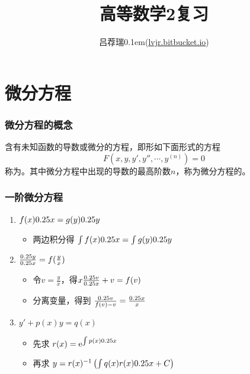 \documentclass[14pt,notheorems,leqno,xcolor={rgb}]{beamer} %
\begin{document}



\title{高等数学2复习}

\author{吕荐瑞\kern0.1em(\href{https://lvjr.bitbucket.io}{lvjr.bitbucket.io})}

\begin{frame}[plain]
\transboxout %
\titlepage
\end{frame}


\makeatletter
{}\relax
\setcounter{section}{6}
\makeatother

\section{微分方程}

\begin{frame}
\frametitle{微分方程的概念}
\begin{definition}
含有未知函数的导数或微分的方程，即形如下面形式的方程
\[ F(x,y,y',y'',\cdots,y^{(n)})=0 \]
称为。其中微分方程中出现的导数的最高阶数$n$，称为微分方程的。
\end{definition}
\end{frame}

\begin{frame}
\frametitle{一阶微分方程}
\begin{enumerate}[<+->]
  \item {} $f(x)0.25 x=g(y)0.25 y$
  \begin{itemize}[<+->]
    \item 两边积分得 $\int f(x)0.25 x=\int g(y)0.25 y$
  \end{itemize}
  \item {} $\frac{0.25 y}{0.25 x}=f(\frac{y}{x})$
  \begin{itemize}[<+->]
    \item 令$v=\frac{y}x$，得$x\frac{0.25 v}{0.25 x}+v=f(v)$
    \item 分离变量，得到 $\frac{0.25 v}{f(v)-v}=\frac{0.25 x}{x}$
  \end{itemize}
  \item {} $y'+p(x)y=q(x)$
  \begin{itemize}[<+->]
    \item 先求 $r(x)=\mathrm{e}^{\int p(x)0.25 x}$
    \item 再求 $y=r(x)^{-1}\left(\int q(x)r(x)0.25 x + C\right)$
  \end{itemize}
\end{enumerate}
\end{frame}
\end{document}

